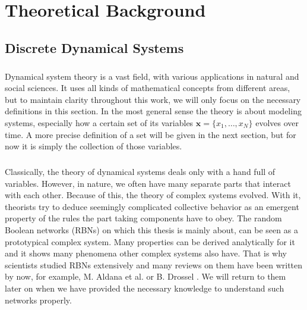 \chapter{Theoretical Background}\thispagestyle{fancy}
\section{Discrete Dynamical Systems}

\paragraph*{}
Dynamical system theory is a vast field, with various applications in natural and social sciences. It uses all kinds of mathematical concepts from different areas, but to maintain clarity throughout this work, we will only focus on the necessary definitions in this section. In the most general sense the theory is about modeling systems, especially how a certain set of its variables $ \boldsymbol{x} = \{x_1,\dots,x_N\} $ evolves over time. A more precise definition of a set will be given in the next section, but for now it is simply the collection of those variables. 

\paragraph*{}
Classically, the theory of dynamical systems deals only with a hand full of variables. However, in nature, we often have many separate parts that interact with each other. Because of this, the theory of complex systems evolved. With it, theorists try to deduce seemingly complicated collective behavior as an emergent property of the rules the part taking components have to obey. The random Boolean networks (RBNs) on which this thesis is mainly about, can be seen as a prototypical complex system. Many properties can be derived analytically for it and it shows many phenomena other complex systems also have. That is why scientists studied RBNs extensively and many reviews on them have been written by now, for example, M. Aldana et al. \cite{aldana2003boolean} or B. Drossel \cite{drossel2008random}. We will return to them later on when we have provided the necessary knowledge to understand such networks properly.


